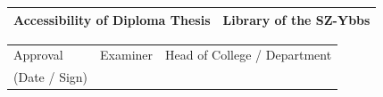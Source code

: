 \begin{tabular}{|p{\feldC}|p{\feldD}|}
 \hline
 Accessibility of Diploma Thesis & Library of the SZ-Ybbs\\
 \hline
\end{tabular}

\begin{tabular}{|p{\feldC}|p{\feldE}|p{\feldE}|}
 \hline
 Approval & \scriptsize{Examiner} & \scriptsize{Head of College / Department}\\ 
 (Date / Sign)& & \\
 \hline
\end{tabular}
\linespread{1.25} \normalsize

